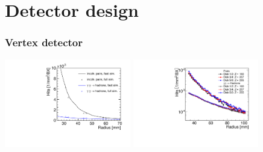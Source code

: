 \documentclass{beamer}
\begin{document}
\section{Detector design}
\begin{frame}
\frametitle{Vertex detector}
\includegraphics[width=5.5cm]{occupancies-barrel.pdf}
\includegraphics[width=5.5cm]{vtx-ftd-hit-density.pdf}
\end{frame}
\end{document}
